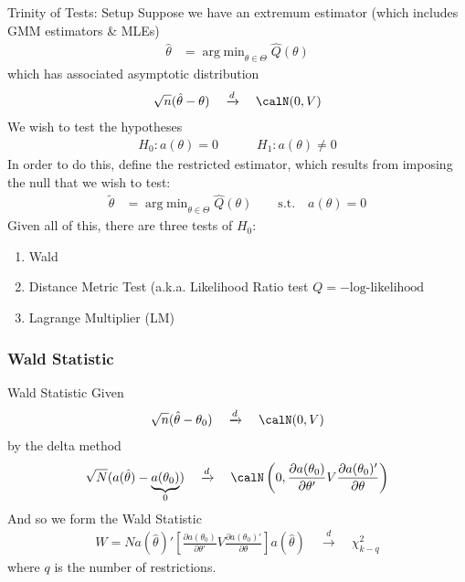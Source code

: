 \documentclass[aspectratio=169, handout]{beamer}
\DeclareMathOperator*{\argmin}{arg\;min}
\newcommand{\dto}{\xrightarrow{d}}
\begin{document}
{\footnotesize
\begin{frame}{Trinity of Tests: Setup}
Suppose we have an extremum estimator
(which includes GMM estimators \& MLEs)
\begin{align*}
  \hat{\theta}
  &=
  \argmin_{\theta\in\Theta}
  \hat{Q}(\theta)
\end{align*}
which has associated asymptotic distribution
\begin{align*}
  \sqrt{n}(\hat{\theta}-\theta)
  \quad\dto\quad
  \calN(0,V)
\end{align*}
We wish to test the hypotheses
\begin{align*}
  H_0: a(\theta)=0
  \qquad\quad
  H_1: a(\theta)\neq 0
\end{align*}
In order to do this, define the \alert{restricted estimator}, which
results from imposing the null that we wish to test:
\begin{align*}
  \tilde{\theta}
  &=
  \argmin_{\theta\in\Theta}
  \hat{Q}(\theta)
  \qquad\text{s.t.}\quad
  a(\theta)=0
\end{align*}
Given all of this, there are three tests of $H_0$:
\vspace{-7pt}
\begin{enumerate}
  \item Wald
  \item Distance Metric Test (a.k.a. Likelihood Ratio test
    $Q=-\text{log-likelihood}$
  \item Lagrange Multiplier (LM)
\end{enumerate}
\end{frame}
}

\subsubsection{Wald Statistic}

\begin{frame}[shrink]{Wald Statistic}
Given
\begin{align*}
  \sqrt{n}
  (
  \hat{\theta}-\theta_0
  )
  \quad\dto\quad
  \calN(0,V)
\end{align*}
by the delta method
\begin{align*}
  \sqrt{N}
  (
  a(\hat{\theta})
  -
  \underbrace{%
    a(\theta_0)
  }_0
  )
  \quad\dto\quad
  \calN\left(
  0,
  \frac{\partial a(\theta_0)}{\partial \theta'}
  V
  \frac{\partial a(\theta_0)'}{\partial \theta}
  \right)
\end{align*}
And so we form the \alert{Wald Statistic}
\begin{align*}
  W
  =
  Na(\hat{\theta})'
  \left[
  \frac{\partial a(\theta_0)}{\partial \theta'}
  V
  \frac{\partial a(\theta_0)'}{\partial \theta}
  \right]
  a(\hat{\theta})
  \quad
  \dto
  \quad
  \chi^2_{k-q}
\end{align*}
where $q$ is the number of restrictions.
\end{frame}
\end{document}
